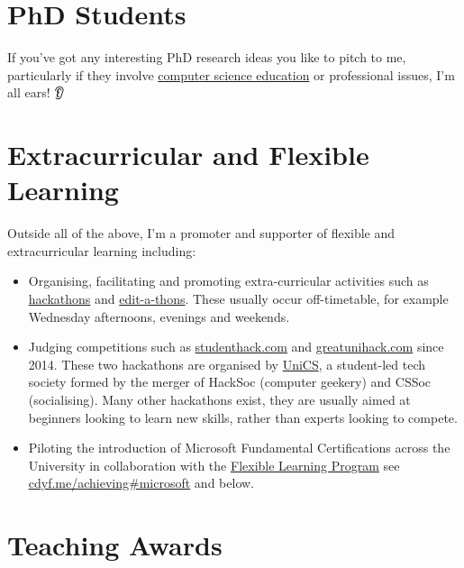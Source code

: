 \documentclass[
  12pt,
]{book}
\providecommand{\tightlist}{%
  \setlength{\itemsep}{0pt}\setlength{\parskip}{0pt}}
\begin{document}
\hypertarget{phds}{%
\section{PhD Students}\label{phds}}

If you've got any interesting PhD research ideas you like to pitch to me, particularly if they involve \href{https://sigcse.cs.manchester.ac.uk}{computer science education} or professional issues, I'm all ears! 👂

\hypertarget{extra}{%
\section{Extracurricular and Flexible Learning}\label{extra}}

Outside all of the above, I'm a promoter and supporter of flexible and extracurricular learning including:

\begin{itemize}
\tightlist
\item
  Organising, facilitating and promoting extra-curricular activities such as \href{https://en.wikipedia.org/wiki/Hackathon}{hackathons} \citep{Briscoe, Warner2017} and \href{https://en.wikipedia.org/wiki/Edit-a-thon}{edit-a-thons}. \citep{goodbadugly, troubled, findingada2019} These usually occur off-timetable, for example Wednesday afternoons, evenings and weekends.
\item
  Judging competitions such as \href{https://www.studenthack.com}{studenthack.com} and \href{https://greatunihack.com}{greatunihack.com} since 2014. These two hackathons are organised by \href{https://www.unicsmcr.com/}{UniCS}, a student-led tech society formed by the merger of HackSoc (computer geekery) and CSSoc (socialising). Many other hackathons exist, they are usually aimed at beginners looking to learn new skills, rather than experts looking to compete. \citep{Briscoe, hafb}
\item
  Piloting the introduction of Microsoft Fundamental Certifications across the University in collaboration with the \href{https://www.manchester.ac.uk/discover/teaching-and-learning-excellence/flexible-learning/}{Flexible Learning Program} see \href{https://www.cdyf.me/achieving\#microsoft}{cdyf.me/achieving\#microsoft} and below. \citep{georgepettifer}
\end{itemize}

\hypertarget{awards}{%
\section{Teaching Awards}\label{awards}}
\end{document}
